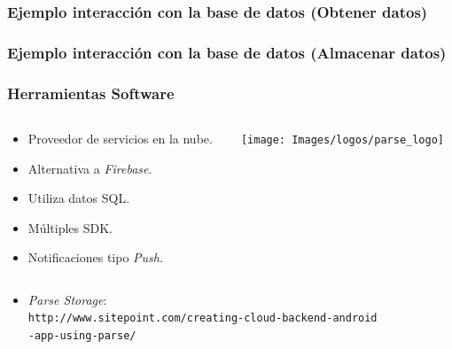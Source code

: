 
\begin{frame}
	\frametitle{Ejemplo interacción con la base de datos (Obtener datos)}
	
\end{frame}


\begin{frame}
	\frametitle{Ejemplo interacción con la base de datos (Almacenar datos)}
	
\end{frame}


\begin{frame}
	\frametitle{Herramientas Software}
	\begin{columns}
		\begin{column}{0.6\textwidth}
			\begin{itemize}
				\item Proveedor de servicios en la nube.
				\item Alternativa a {\it Firebase}.
				\item Utiliza datos SQL.
				\item Múltiples SDK.
				\item Notificaciones tipo {\it Push}.
			\end{itemize}
			\endblock{}
		\end{column}
		\begin{column}{0.4\textwidth}
			\vfill 
			\begin{center}
				\texttt{[image: Images/logos/parse\_logo]}
			\end{center}
		\end{column}
	\end{columns}
		\begin{itemize}
			\item {\it Parse Storage}:\\ {\texttt{http://www.sitepoint.com/creating-cloud-backend-android\\-app-using-parse/}}
		\end{itemize}
	\endblock{}
\end{frame}